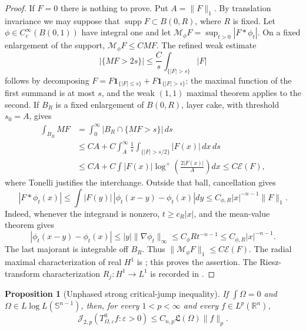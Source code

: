 \documentclass[11pt]{article}
\numberwithin{equation}{section}
\newtheorem{proposition}[theorem]{Proposition}
\theoremstyle{remark}
\theoremstyle{definition}
\newcommand{\R}{\mathbb R}
\newcommand{\Sph}{\mathbb S}
\newcommand{\supp}{\operatorname{supp}}
\newcommand{\norm}[1]{\lVert #1\rVert}
\newcommand{\Jop}[1]{\mathcal J_{2,#1}}
\begin{document}
\begin{proof}
If $F=0$ there is nothing to prove.  Put $A=\norm F_1$.
By translation invariance we may suppose that
$\supp F\subset B(0,R)$, where $R$ is fixed.
Let $\phi\in C_c^\infty(B(0,1))$ have integral one and let
$\mathcal M_\phi F=\sup_{t>0}|F*\phi_t|$.  On a fixed enlargement of the
support, $\mathcal M_\phi F\le C MF$.  The refined weak estimate
\[
 |\{MF>2s\}|\le \frac C s\int_{\{|F|>s\}}|F|
\]
follows by decomposing
$F=F\mathbf1_{\{|F|\le s\}}+F\mathbf1_{\{|F|>s\}}$: the maximal
function of the first summand is at most $s$, and the weak $(1,1)$ maximal
theorem applies to the second.  If $B_R$ is a fixed enlargement of
$B(0,R)$, layer cake, with threshold $s_0=A$, gives
\begin{align*}
 \int_{B_R}MF
 &=\int_0^\infty|B_R\cap\{MF>s\}|\,ds\\
 &\le C A+C\int_A^\infty\frac1s
       \int_{\{|F|>s/2\}}|F(x)|\,dx\,ds\\
 &\le C A+C\int|F(x)|
       \log^+\!\left(\frac{2|F(x)|}{A}\right)dx
 \le C\mathcal E(F),
\end{align*}
where Tonelli justifies the interchange.  Outside that ball, cancellation
gives
\[
 |F*\phi_t(x)|
 \le\int|F(y)|\,|\phi_t(x-y)-\phi_t(x)|dy
 \le C_{\phi,R}|x|^{-n-1}\norm F_1.
\]
Indeed, whenever the integrand is nonzero, $t\ge c_R|x|$, and the
mean-value theorem gives
\[
 |\phi_t(x-y)-\phi_t(x)|
 \le |y|\|\nabla\phi_t\|_\infty
 \le C_\phi R t^{-n-1}
 \le C_{\phi,R}|x|^{-n-1}.
\]
The last majorant is integrable off $B_R$.  Thus
$\norm{\mathcal M_\phi F}_1\le C\mathcal E(F)$.  The radial
maximal characterization of real $H^1$ is
\cite[Theorem~11 and the following Remark~2]{FS72}; this proves the
assertion.  The Riesz-transform characterization
$R_j:H^1\to L^1$ is recorded in
\cite[Section~II.2, p.~144]{FS72}.
\end{proof}

\begin{proposition}[Unphased strong critical-jump inequality]
\label{prop:nonosc-strong}
If $\int\Omega=0$ and $\Omega\in L\log L(\Sph^{n-1})$, then, for every
$1<p<\infty$ and every $f\in L^p(\R^n)$,
\begin{equation}\label{eq:nonosc-strong}
 \Jop{p}(T^0_{\Omega,\varepsilon}f:\varepsilon>0)
 \le C_{n,p}\mathfrak L(\Omega)\norm f_p.
\end{equation}
\end{proposition}
\end{document}
